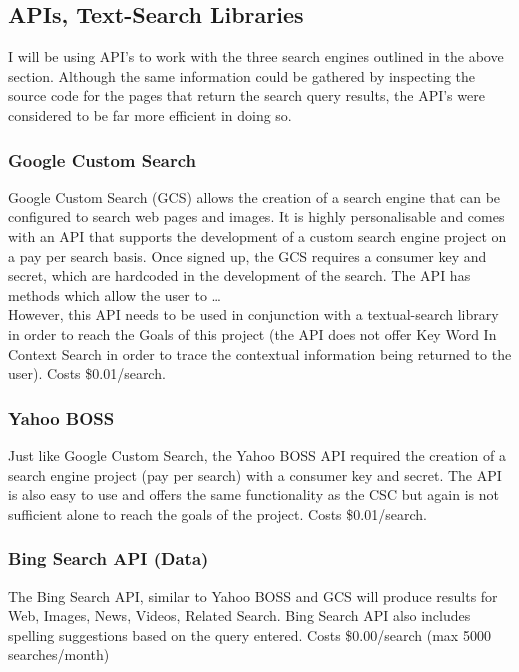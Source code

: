 \documentclass[11pt]{article}
\begin{document}
\subsection{APIs, Text-Search Libraries }
I will be using API’s to work with the three search engines outlined in the above section. Although the same information could be gathered by inspecting the source code for the pages that return the search query results, the API’s were considered to be far more efficient in doing so. 

\subsubsection{Google Custom Search}
Google Custom Search (GCS) allows the creation of a search engine that can be configured to search web pages and images. It is highly personalisable and comes with an API that supports the development of a custom search engine project on a pay per search basis. Once signed up, the GCS requires a consumer key and secret, which are hardcoded in the development of the search.
The API has methods which allow the user to …\\
However, this API needs to be used in conjunction with a textual-search library in order to reach the Goals of this project (the API does not offer Key Word In Context Search in order to trace the contextual information being returned to the user). Costs \$0.01/search.

\subsubsection{Yahoo BOSS}
Just like Google Custom Search, the Yahoo BOSS API required the creation of a search engine project (pay per search) with a consumer key and secret. The API is also easy to use and offers the same functionality as the CSC but again is not sufficient alone to reach the goals of the project. Costs \$0.01/search.

\subsubsection{Bing Search API (Data)}
The Bing Search API, similar to Yahoo BOSS and GCS will produce results for Web, Images, News, Videos, Related Search. Bing Search API also includes spelling suggestions based on the query entered. Costs \$0.00/search (max 5000 searches/month)
\end{document}

